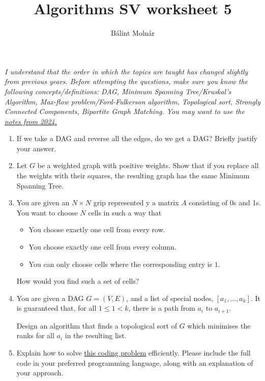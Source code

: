 \documentclass{article}
\title{{Algorithms SV worksheet 5}}
\author{Bálint Molnár}
\begin{document}
\maketitle
 
\emph{I understand that the order in which the topics are taught has changed slightly from previous years. Before attempting the questions, make sure you know the following concepts/definitions: DAG, Minimum Spanning Tree/Kruskal's Algorithm, Max-flow problem/Ford-Fulkerson algorithm, Topological sort, Strongly Connected Components, Bipartite Graph Matching. You may want to use the \href{https://www.cl.cam.ac.uk/teaching/2324/Algorithm1/content/algorithms2.pdf}{notes from 2024.}}

\begin{enumerate}
    \item If we take a DAG and reverse all the edges, do we get a DAG? Briefly justify your answer.

    \item Let $G$ be a weighted graph with positive weights. Show that if you replace all the weights with their squares, the resulting graph has the same Minimum Spanning Tree.

    \item You are given an $N \times N $ grip represented y a matrix $A$ consisting of 0s and 1s. You want to choose $N$ cells in such a way that
    \begin{itemize}
        \item You choose exactly one cell from every row.
        \item You choose exactly one cell from every column.
        \item You can only choose cells where the corresponding entry is $1$.
    \end{itemize}

    How would you find such a set of cells?


    \item You are given a DAG $G=(V,E)$, and a list of special nodes, $[a_1, ..., a_k]$. It is guaranteed that, for all $1 \leq 1 < k$, there is a path from $a_i$ to $a_{i+1}$.

    Design an algorithm that finds a topological sort of $G$ which minimises the ranks for all $a_i$ in the resulting list.


\item Explain how to solve \href{https://cses.fi/problemset/task/1677}{this coding problem} efficiently. Please include the full code in your preferred programming language, along with an explanation of your approach.


\end{enumerate}
\end{document}
